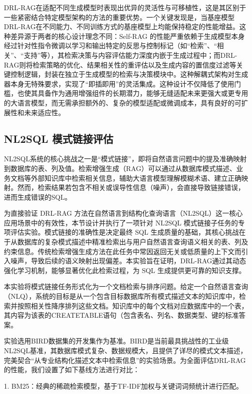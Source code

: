 \documentclass[12pt,a4paper,openright,UTF8]{ctexbook}
\begin{document}
DRL-RAG在适配不同生成模型时表现出优异的灵活性与可移植性，这是其区别于一些紧密结合特定模型架构的方法的重要优势。一个关键发现是，当基座模型DRL-RAG在不同能力、不同训练方式的基座模型上均能保持稳定的性能增益。这种差异源于两者的核心设计理念不同：Self-RAG 的性能严重依赖于生成模型本身经过针对性指令微调以学习和输出特定的反思与控制标记（如“检索”、“相关”、“支持”等），其检索决策与内容评估能力深度内嵌于生成过程中；而DRL-RAG则将检索策略的优化、结果相关性的重评估以及生成内容的置信度过滤等关键控制逻辑，封装在独立于生成模型的检索与决策模块中。这种解耦式架构对生成器本身无特殊要求，实现了“即插即用”的灵活集成。这种设计不仅降低了使用门槛，也使其具备作为通用增强组件的长期潜力，能够无缝适配未来更强大或更专用的大语言模型，而无需承担额外的、复杂的模型适配或微调成本，具有良好的可扩展性和未来适应性。

\subsection{NL2SQL 模式链接评估}

NL2SQL系统的核心挑战之一是“模式链接”，即将自然语言问题中的提及准确映射到数据库的表、列及值。检索增强生成（RAG）可以通过从数据库模式描述、业务文档等外部知识库中检索相关信息，辅助大语言模型理解模糊术语、建立正确映射。然而，检索结果若包含不相关或误导性信息（噪声），会直接导致链接错误，进而生成错误的SQL。


为直接验证 DRL-RAG 方法在自然语言到结构化查询语言（NL2SQL）这一核心应用场景中的有效性，本节设计并执行了一项针对 NL2SQL 模式链接子任务的专项评估实验。模式链接的准确性是决定最终 SQL 生成质量的基础，其核心挑战在于从数据库的复杂模式描述中精准检索出与用户自然语言查询语义相关的表、列及约束信息。传统检索增强生成方法在此任务中常因返回无关或低质量的上下文而引入噪声，导致后续的语义映射出现偏差。本实验旨在证明，DRL-RAG通过其动态强化学习机制，能够显著优化此检索过程，为 SQL 生成提供更可靠的知识支撑。


本实验将模式链接任务形式化为一个文档检索与排序问题。给定一个自然语言查询（NLQ），系统的目标是从一个包含目标数据库所有模式描述文本的知识库中，检索并按照相关性降序排列这些文档。知识库中的每个文档对应数据库中的一个表，其内容为该表的CREATETABLE语句（包含表名、列名、数据类型、键的标准答案。


实验选用BIRD数据集的开发集作为基准。BIRD是当前最具挑战性的工业级NL2SQL基准，其数据库模式复杂、数据规模大，且提供了详尽的模式文本描述，完美契合“从专业结构化描述文本中检索信息”的实验场景。为全面评估DRL-RAG的性能，我们设置了如下基线方法进行对比：


1. BM25：经典的稀疏检索模型，基于TF-IDF加权与关键词词频统计进行匹配。
\end{document}
